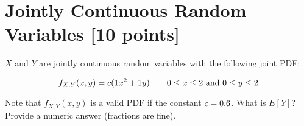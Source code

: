 \newpage
\section{Jointly Continuous Random Variables [10 points]}

$X$ and $Y$ are jointly continuous random variables with the following joint PDF:

\begin{equation}
f_{X,Y}(x,y) = c(1{} x^2 + 1{} y) \qquad 0 \leq x\leq 2{} \text{ and } 0 \leq y \leq 2{}
\end{equation}

Note that $f_{X,Y}(x,y)$ is a valid PDF if the constant $c = 0.6{}$. What is $E[Y]$? Provide a numeric answer (fractions are fine).
	
		
		

